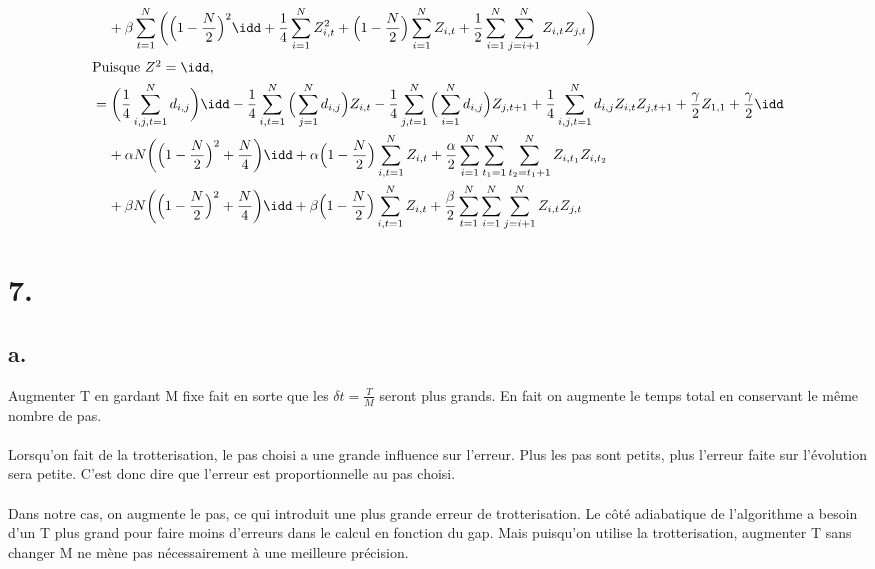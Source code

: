 \documentclass{article}
\begin{document}
\begin{align*}
    &\:\:\:\:\:+\beta\sum_{t=1}^N\bigg(\Big(1-\frac{N}{2}\Big)^2\idd+\frac{1}{4}\sum_{i=1}^NZ_{i,t}^2+\Big(1-\frac{N}{2}\Big)\sum_{i=1}^NZ_{i,t}+\frac{1}{2}\sum_{i=1}^N\sum_{j=i+1}^NZ_{i,t}Z_{j,t}\bigg)\\
    \intertext{Puisque $Z^2=\idd$,}
    &=\bigg(\frac{1}{4}\sum_{i,j,t=1}^N d_{i,j}\bigg)\idd-\frac{1}{4}\sum_{i,t=1}^N \Big(\sum_{j=1}^N d_{i,j}\Big)Z_{i,t}
    -\frac{1}{4}\sum_{j,t=1}^N \Big(\sum_{i=1}^N d_{i,j}\Big)Z_{j,t+1}+\frac{1}{4}\sum_{i,j,t=1}^N d_{i,j}Z_{i,t}Z_{j,t+1}+\frac{\gamma}{2} Z_{1,1}+\frac{\gamma}{2}\idd\\
    &\:\:\:\:\:+\alpha N\bigg(\Big(1-\frac{N}{2}\Big)^2+\frac{N}{4}\bigg)\idd+\alpha\Big(1-\frac{N}{2}\Big)\sum_{i,t=1}^{N}Z_{i,t}+\frac{\alpha}{2}\sum_{i=1}^{N}\sum_{t_1=1}^N\sum_{t_2=t_1+1}^NZ_{i,t_1}Z_{i,t_2}\\
    &\:\:\:\:\:+\beta N\bigg(\Big(1-\frac{N}{2}\Big)^2+\frac{N}{4}\bigg)\idd+\beta\Big(1-\frac{N}{2}\Big)\sum_{i,t=1}^{N}Z_{i,t}+\frac{\beta}{2}\sum_{t=1}^{N}\sum_{i=1}^N\sum_{j=i+1}^NZ_{i,t}Z_{j,t}
\end{align*}

\section*{7.}
\subsection*{a.}
Augmenter T en gardant M fixe fait en sorte que les $\delta t=\frac{T}{M}$ seront plus grands. En fait on augmente le temps total en conservant le même nombre de pas.
\\\\
Lorsqu'on fait de la trotterisation, le pas choisi a une grande influence sur l'erreur. Plus les pas sont petits, plus l'erreur faite sur l'évolution sera petite. C'est donc dire que l'erreur est proportionnelle au pas choisi. 
\\\\
Dans notre cas, on augmente le pas, ce qui introduit une plus grande erreur de trotterisation. Le côté adiabatique de l'algorithme a besoin d'un T plus grand pour faire moins d'erreurs dans le calcul en fonction du gap. Mais puisqu'on utilise la trotterisation, augmenter T sans changer M ne mène pas nécessairement à une meilleure précision.
\end{document}
